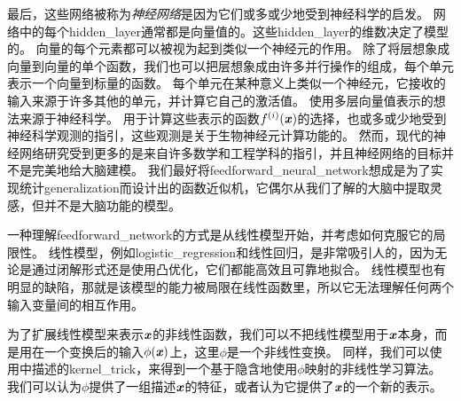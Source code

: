 
最后，这些网络被称为\emph{神经网络}是因为它们或多或少地受到神经科学的启发。
网络中的每个\gls{hidden_layer}通常都是向量值的。这些\gls{hidden_layer}的维数决定了模型的。
向量的每个元素都可以被视为起到类似一个神经元的作用。
除了将层想象成向量到向量的单个函数，我们也可以把层想象成由许多并行操作的组成，每个单元表示一个向量到标量的函数。
每个单元在某种意义上类似一个神经元，它接收的输入来源于许多其他的单元，并计算它自己的激活值。
使用多层向量值表示的想法来源于神经科学。
用于计算这些表示的函数$f^{(i)}(\boldsymbol{\mathit{x}})$的选择，也或多或少地受到神经科学观测的指引，这些观测是关于生物神经元计算功能的。
然而，现代的神经网络研究受到更多的是来自许多数学和工程学科的指引，并且神经网络的目标并不是完美地给大脑建模。
我们最好将\gls{feedforward_neural_network}想成是为了实现统计\gls{generalization}而设计出的函数近似机，它偶尔从我们了解的大脑中提取灵感，但并不是大脑功能的模型。

一种理解\gls{feedforward_network}的方式是从线性模型开始，并考虑如何克服它的局限性。
线性模型，例如\gls{logistic_regression}和线性回归，是非常吸引人的，因为无论是通过闭解形式还是使用凸优化，它们都能高效且可靠地拟合。
线性模型也有明显的缺陷，那就是该模型的能力被局限在线性函数里，所以它无法理解任何两个输入变量间的相互作用。

为了扩展线性模型来表示$\boldsymbol{\mathit{x}}$的非线性函数，我们可以不把线性模型用于$\boldsymbol{\mathit{x}}$本身，而是用在一个变换后的输入$\phi(\boldsymbol{\mathit{x}})$上，这里$\phi$是一个非线性变换。
同样，我们可以使用中描述的\gls{kernel_trick}，来得到一个基于隐含地使用$\phi$映射的非线性学习算法。
我们可以认为$\phi$提供了一组描述$\boldsymbol{\mathit{x}}$的特征，或者认为它提供了$\boldsymbol{\mathit{x}}$的一个新的表示。


